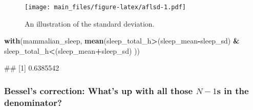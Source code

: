 \documentclass[
]{book}
\newenvironment{Shaded}{\begin{snugshade}}{\end{snugshade}}
\newcommand{\FunctionTok}[1]{\textcolor[rgb]{0.13,0.29,0.53}{\textbf{#1}}}
\newcommand{\NormalTok}[1]{#1}
\newcommand{\SpecialCharTok}[1]{\textcolor[rgb]{0.81,0.36,0.00}{\textbf{#1}}}
\begin{document}
\begin{figure}
\centering
\texttt{[image: main\_files/figure-latex/aflsd-1.pdf]}
\caption{\label{fig:aflsd}An illustration of the standard deviation.}
\end{figure}

\begin{Shaded}
\begin{Highlighting}[]
  \FunctionTok{with}\NormalTok{(mammalian\_sleep, }\FunctionTok{mean}\NormalTok{(sleep\_total\_h}\SpecialCharTok{\textgreater{}}\NormalTok{(sleep\_mean}\SpecialCharTok{{-}}\NormalTok{sleep\_sd) }\SpecialCharTok{\&}\NormalTok{ sleep\_total\_h}\SpecialCharTok{\textless{}}\NormalTok{(sleep\_mean}\SpecialCharTok{+}\NormalTok{sleep\_sd) ))}
\end{Highlighting}
\end{Shaded}

\begin{Shaded}
\begin{Highlighting}[]
\NormalTok{\#\# [1] 0.6385542}
\end{Highlighting}
\end{Shaded}

\hypertarget{bessels-correction-whats-up-with-all-those-n-1s-in-the-denominator}{%
\subsubsection{\texorpdfstring{Bessel's correction: What's up with all those \(N-1\)s in the denominator?}{Bessel's correction: What's up with all those N-1s in the denominator?}}\label{bessels-correction-whats-up-with-all-those-n-1s-in-the-denominator}}
\end{document}
